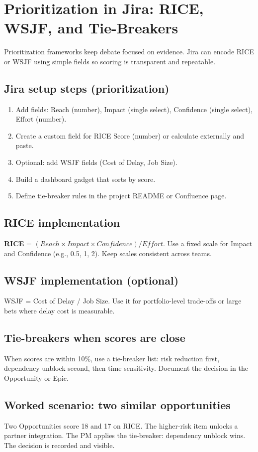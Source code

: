 \section{Prioritization in Jira: RICE, WSJF, and Tie-Breakers}
Prioritization frameworks keep debate focused on evidence. Jira can encode RICE or WSJF using simple fields so scoring is transparent and repeatable.

\subsection{Jira setup steps (prioritization)}
\begin{enumerate}
  \item Add fields: Reach (number), Impact (single select), Confidence (single select), Effort (number).
  \item Create a custom field for RICE Score (number) or calculate externally and paste.
  \item Optional: add WSJF fields (Cost of Delay, Job Size).
  \item Build a dashboard gadget that sorts by score.
  \item Define tie-breaker rules in the project README or Confluence page.
\end{enumerate}

\subsection{RICE implementation}
\textbf{RICE} = $(Reach \times Impact \times Confidence) / Effort$. Use a fixed scale for Impact and Confidence (e.g., 0.5, 1, 2). Keep scales consistent across teams.

\subsection{WSJF implementation (optional)}
WSJF = Cost of Delay / Job Size. Use it for portfolio-level trade-offs or large bets where delay cost is measurable.

\subsection{Tie-breakers when scores are close}
When scores are within 10\%, use a tie-breaker list: risk reduction first, dependency unblock second, then time sensitivity. Document the decision in the Opportunity or Epic.

\subsection{Worked scenario: two similar opportunities}
Two Opportunities score 18 and 17 on RICE. The higher-risk item unlocks a partner integration. The PM applies the tie-breaker: dependency unblock wins. The decision is recorded and visible.

